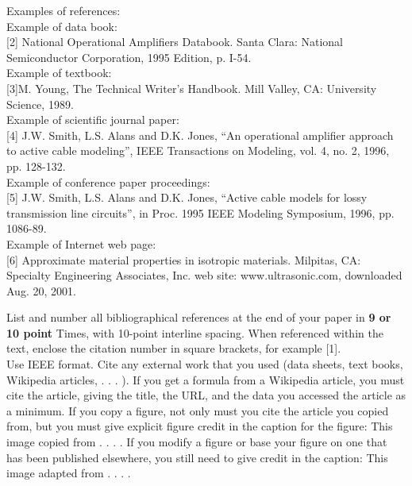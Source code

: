 \documentclass[journal]{IEEEtran}
\begin{document}

\printbibliography


Examples of references:  \\[0.001in]

Example of data book:\\[0.1in]
[2] National Operational Amplifiers Databook. Santa Clara: National Semiconductor
Corporation, 1995 Edition, p. I-54. \\[0.1in]
Example of textbook: \\[0.1in]
[3]M. Young, The Technical Writer’s Handbook. Mill Valley, CA: University Science, 1989.\\[0.1in]
Example of scientific journal paper:\\[0.1in]
[4] J.W. Smith, L.S. Alans and D.K. Jones, “An operational amplifier approach to
active cable modeling”, IEEE Transactions on Modeling, vol. 4, no. 2, 1996, pp.
128-132.\\[0.1in]
Example of conference paper proceedings:\\[0.1in]
[5] J.W. Smith, L.S. Alans and D.K. Jones, “Active cable models for lossy
transmission line circuits”, in Proc. 1995 IEEE Modeling Symposium, 1996, pp.
1086-89.\\[0.1in]

Example of Internet web page:\\[0.1in]
[6] Approximate material properties in isotropic materials. Milpitas, CA: Specialty
Engineering Associates, Inc. web site: www.ultrasonic.com, downloaded Aug. 20,
2001. 

List and number all bibliographical 
references at the end of your paper in {\bf 9 or 10 point} Times, with 10-point interline spacing. When referenced within the text, enclose the citation number in square brackets, for example [1]. \\
Use IEEE format. Cite any external work that you used (data sheets, text books, Wikipedia articles, . . . ). If you get a formula from a Wikipedia article, you must cite the article, giving the title, the URL, and the data you accessed the article as a minimum. If you copy a figure, not only must you cite the article you copied from, but you must give explicit figure credit in the caption for the figure: This image copied from . . . . If you modify a figure or base your figure on one that has been published elsewhere, you still need to give credit in the caption: This image adapted from . . . .\\[0.1in]

\end{document}
